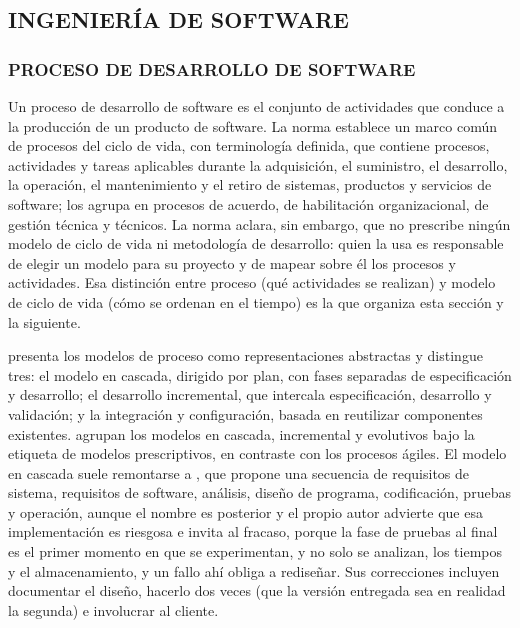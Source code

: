 \subsection{INGENIERÍA DE SOFTWARE}
\subsubsection{PROCESO DE DESARROLLO DE SOFTWARE}

Un proceso de desarrollo de software es el conjunto de actividades que conduce a la producción de un producto de software. La norma \textcite{ISO12207-2017} establece un marco común de procesos del ciclo de vida, con terminología definida, que contiene procesos, actividades y tareas aplicables durante la adquisición, el suministro, el desarrollo, la operación, el mantenimiento y el retiro de sistemas, productos y servicios de software; los agrupa en procesos de acuerdo, de habilitación organizacional, de gestión técnica y técnicos. La norma aclara, sin embargo, que no prescribe ningún modelo de ciclo de vida ni metodología de desarrollo: quien la usa es responsable de elegir un modelo para su proyecto y de mapear sobre él los procesos y actividades. Esa distinción entre proceso (qué actividades se realizan) y modelo de ciclo de vida (cómo se ordenan en el tiempo) es la que organiza esta sección y la siguiente.

\textcite{Sommerville2016} presenta los modelos de proceso como representaciones abstractas y distingue tres: el modelo en cascada, dirigido por plan, con fases separadas de especificación y desarrollo; el desarrollo incremental, que intercala especificación, desarrollo y validación; y la integración y configuración, basada en reutilizar componentes existentes. \textcite{Pressman2020} agrupan los modelos en cascada, incremental y evolutivos bajo la etiqueta de modelos prescriptivos, en contraste con los procesos ágiles. El modelo en cascada suele remontarse a \textcite{Royce1970}, que propone una secuencia de requisitos de sistema, requisitos de software, análisis, diseño de programa, codificación, pruebas y operación, aunque el nombre es posterior y el propio autor advierte que esa implementación es riesgosa e invita al fracaso, porque la fase de pruebas al final es el primer momento en que se experimentan, y no solo se analizan, los tiempos y el almacenamiento, y un fallo ahí obliga a rediseñar. Sus correcciones incluyen documentar el diseño, hacerlo dos veces (que la versión entregada sea en realidad la segunda) e involucrar al cliente.

